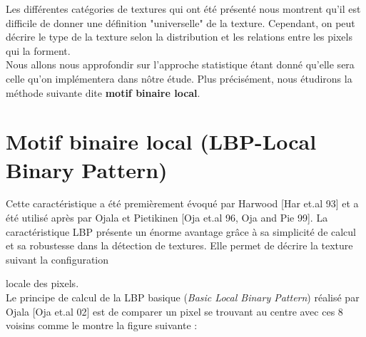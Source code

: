 \indent Les différentes catégories de textures qui ont été présenté nous montrent qu’il est difficile de donner une définition "universelle" de la texture. Cependant, on peut décrire le type de la texture selon la distribution et les relations entre les pixels qui la forment.\\

\indent Nous allons nous approfondir sur l’approche statistique étant donné qu’elle sera celle qu’on implémentera dans nôtre étude.
Plus précisément, nous étudirons la méthode suivante dite \textbf{motif binaire local}.



\section{Motif binaire local (LBP-Local Binary Pattern)}
\indent Cette caractéristique a été premièrement évoqué par Harwood [Har et.al 93] et a été utilisé après par Ojala et Pietikinen [Oja et.al 96, Oja and Pie 99].
La caractéristique LBP présente un énorme avantage grâce à sa simplicité de calcul et sa robustesse dans la détection de textures. Elle permet de décrire la texture suivant la configuration 

 locale des pixels.\\ 
\indent Le principe de calcul de la LBP basique (\textit{Basic Local Binary Pattern}) réalisé par Ojala [Oja et.al 02] est de comparer un pixel se trouvant au centre avec ces 8 voisins comme le montre la figure suivante :

